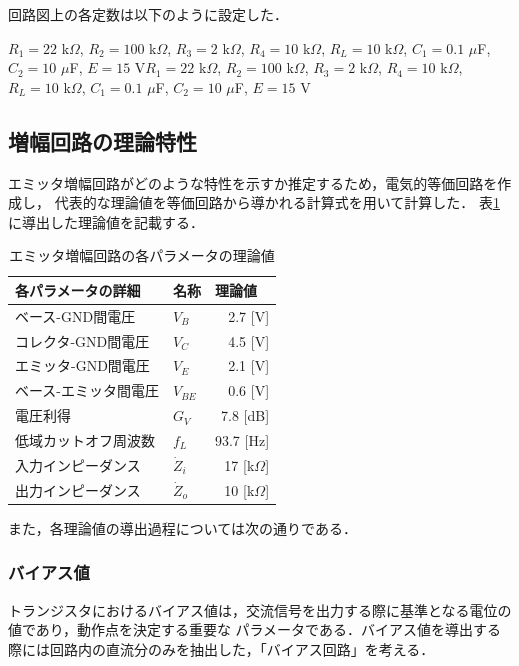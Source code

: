 \documentclass[dvipdfmx,titlepage,a4j]{jsarticle}  %
\numberwithin{equation}{section}
\begin{document}
回路図上の各定数は以下のように設定した．

$R_1 = 22$ k$\Omega$, $R_2 = 100$ k$\Omega$, $R_3 = 2$ k$\Omega$, $R_4 = 10$ k$\Omega$,
$R_L = 10$ k$\Omega$, $C_1 = 0.1$ $\mu$F, $C_2 = 10$ $\mu$F, $E = 15$ V$R_1 = 22$ k$\Omega$, $R_2 = 100$ k$\Omega$, $R_3 = 2$ k$\Omega$, $R_4 = 10$ k$\Omega$,
$R_L = 10$ k$\Omega$, $C_1 = 0.1$ $\mu$F, $C_2 = 10$ $\mu$F, $E = 15$ V

\subsection{増幅回路の理論特性}
エミッタ増幅回路がどのような特性を示すか推定するため，電気的等価回路を作成し，
代表的な理論値を等価回路から導かれる計算式を用いて計算した．
表\ref{tbl:tr;the}に導出した理論値を記載する．

\begin{table}[htbp]
  \caption{エミッタ増幅回路の各パラメータの理論値}
  \begin{center}
    \begin{tabular}{l|l|r}
      \hline
      各パラメータの詳細    & 名称        & \multicolumn{1}{l}{理論値} \\ \hline \hline
      ベース-GND間電圧      & $V_B$       & 2.7 [V]                    \\ \hline
      コレクタ-GND間電圧    & $V_C$       & 4.5 [V]                    \\ \hline
      エミッタ-GND間電圧    & $V_E$       & 2.1 [V]                    \\ \hline
      ベース-エミッタ間電圧 & $V_{BE}$    & 0.6 [V]                    \\ \hline
      電圧利得              & $G_V$       & 7.8 [dB]                   \\ \hline
      低域カットオフ周波数  & $f_L$       & 93.7 [Hz]                  \\ \hline
      入力インピーダンス    & $\dot{Z}_i$ & 17 [k$\Omega$]             \\ \hline
      出力インピーダンス    & $\dot{Z}_o$ & 10 [k$\Omega$]             \\ \hline
    \end{tabular}
  \end{center}
  \label{tbl:tr;the}
\end{table}

また，各理論値の導出過程については次の通りである．

\subsubsection{バイアス値}
トランジスタにおけるバイアス値は，交流信号を出力する際に基準となる電位の値であり，動作点を決定する重要な
パラメータである．バイアス値を導出する際には回路内の直流分のみを抽出した，「バイアス回路」を考える．
\end{document}
